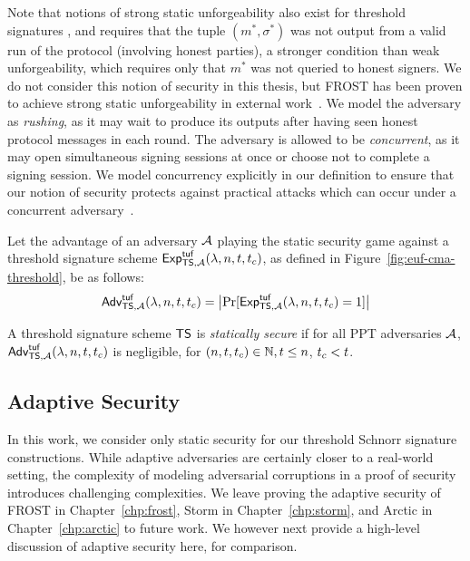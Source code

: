 Note that notions of strong static unforgeability also exist for threshold signatures \cite{BellareCKMTZ22},
and requires that the tuple $(m^*, \sigma^*)$ was not output from a valid run of the protocol (involving honest parties),
a stronger condition than weak unforgeability,
which requires only that $m^*$ was not queried to honest signers.
We do not consider this notion of security in this thesis,
but FROST has been proven to achieve strong static unforgeability in external work~\cite{BellareCKMTZ22}.
%
We model the adversary as \emph{rushing},
as it may wait to produce its outputs after having seen honest protocol messages in each round.
The adversary is allowed to be \emph{concurrent},
as it may open simultaneous signing sessions at once
or choose not to complete a signing session.
We model concurrency explicitly in our definition to ensure that our notion of security protects against practical attacks which can occur under a concurrent adversary~\cite{BenhamoudaLLOR20}.

\begin{definition}
  \label{defn:thresh-static-unforg}
Let the advantage of an adversary $\mathcal{A}$ playing the static security game against a threshold signature scheme
$\textsf{\upshape Exp}^{\textsf{\upshape tuf}}_{\mathsf{TS},\mathcal{A}}(\lambda, n, t, t_c)$, as defined in Figure~\ref{fig:euf-cma-threshold}, be as follows:
%
\[
  \textsf{\upshape Adv}^{\textrm{\upshape $\mathsf{tuf}$}}_{\mathsf{TS}, \mathcal{A}}(\lambda, n, t, t_c) =
  \bigl| \Pr[\textsf{\upshape Exp}^{\textsf{\upshape tuf}}_{\mathsf{TS},\mathcal{A}}(\lambda, n, t, t_c) = 1] \bigr|
\]

A threshold signature scheme $\mathsf{TS}$ is \emph{statically secure} if for all PPT adversaries $\mathcal{A}$,
$\textsf{\upshape Adv}^{\textrm{\upshape $\mathsf{tuf}$}}_{\mathsf{TS}, \mathcal{A}}(\lambda, n, t,t_c)$ is negligible,
for $(n, t, t_c) \in \mathbb{N}, t \leq n$, $t_c < t$.
\end{definition}


\subsection{Adaptive Security}
\label{adaptive-security}

In this work,
we consider only static security for our threshold Schnorr signature constructions.
While adaptive adversaries are certainly closer to a real-world setting,
the complexity of modeling adversarial corruptions in a proof of security introduces challenging complexities.
We leave proving the adaptive security of FROST in Chapter~\ref{chp:frost},
Storm in Chapter~\ref{chp:storm},
and Arctic in Chapter~\ref{chp:arctic} to future work.
We however next provide a high-level discussion of adaptive security here,
for comparison.


